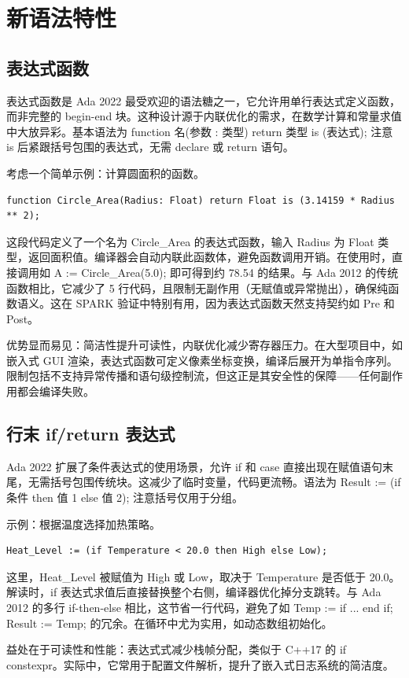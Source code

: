 \chapter{新语法特性}
\section{表达式函数}
表达式函数是 Ada 2022 最受欢迎的语法糖之一，它允许用单行表达式定义函数，而非完整的 begin-end 块。这种设计源于内联优化的需求，在数学计算和常量求值中大放异彩。基本语法为 function 名(参数 : 类型) return 类型 is (表达式); 注意 is 后紧跟括号包围的表达式，无需 declare 或 return 语句。\par
考虑一个简单示例：计算圆面积的函数。\par
\begin{lstlisting}
function Circle_Area(Radius: Float) return Float is (3.14159 * Radius ** 2);
\end{lstlisting}
这段代码定义了一个名为 Circle\_{}Area 的表达式函数，输入 Radius 为 Float 类型，返回面积值。编译器会自动内联此函数体，避免函数调用开销。在使用时，直接调用如 A := Circle\_{}Area(5.0); 即可得到约 78.54 的结果。与 Ada 2012 的传统函数相比，它减少了 5 行代码，且限制无副作用（无赋值或异常抛出），确保纯函数语义。这在 SPARK 验证中特别有用，因为表达式函数天然支持契约如 Pre 和 Post。\par
优势显而易见：简洁性提升可读性，内联优化减少寄存器压力。在大型项目中，如嵌入式 GUI 渲染，表达式函数可定义像素坐标变换，编译后展开为单指令序列。限制包括不支持异常传播和语句级控制流，但这正是其安全性的保障——任何副作用都会编译失败。\par
\section{行末 if/return 表达式}
Ada 2022 扩展了条件表达式的使用场景，允许 if 和 case 直接出现在赋值语句末尾，无需括号包围传统块。这减少了临时变量，代码更流畅。语法为 Result := (if 条件 then 值 1 else 值 2); 注意括号仅用于分组。\par
示例：根据温度选择加热策略。\par
\begin{lstlisting}
Heat_Level := (if Temperature < 20.0 then High else Low);
\end{lstlisting}
这里，Heat\_{}Level 被赋值为 High 或 Low，取决于 Temperature 是否低于 20.0。解读时，if 表达式求值后直接替换整个右侧，编译器优化掉分支跳转。与 Ada 2012 的多行 if-then-else 相比，这节省一行代码，避免了如 Temp := if ... end if; Result := Temp; 的冗余。在循环中尤为实用，如动态数组初始化。\par
益处在于可读性和性能：表达式式减少栈帧分配，类似于 C++17 的 if constexpr。实际中，它常用于配置文件解析，提升了嵌入式日志系统的简洁度。\par
